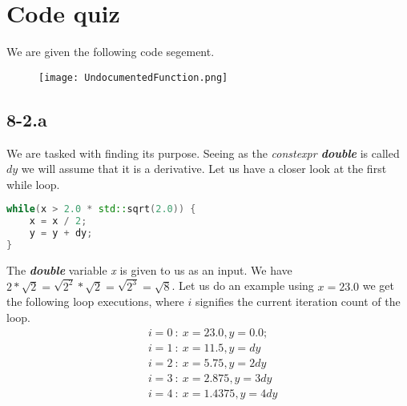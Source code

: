 \documentclass{article}
\begin{document}
\section*{Code quiz}
We are given the following code segement.
\begin{figure}[!hbt]
    \centering
\texttt{[image: UndocumentedFunction.png]}
\end{figure}
\subsection*{8-2.a} 
We are tasked with finding its purpose. Seeing as the \textit{constexpr \textbf{double}} is called $\textit{dy}$ we will assume that it is a derivative. Let us have a closer look at the first while loop.

\begin{lstlisting}[language=C++,
                   directivestyle={\color{black}}
                   emph={int,char,double,float,unsigned},
                   emphstyle={\color{blue}}
                  ]
while(x > 2.0 * std::sqrt(2.0)) {
    x = x / 2;
    y = y + dy;
}
\end{lstlisting}
The \textit{\textbf{double}} variable \textit{x} is given to us as an input. We have $2 * \sqrt{2} = \sqrt{2^{2}} * \sqrt{2} = \sqrt{2^{3}} = \sqrt{8}$. Let us do an example using $x = 23.0$ we get the following loop executions, where $i$ signifies the current iteration count of the loop.
\begin{align*}
    &i = 0\: : \: x = 23.0, y = 0.0; \\
    &i = 1 \: : \: x = 11.5, y = dy \\
    &i = 2 \: : \: x = 5.75, y = 2dy \\
    &i = 3 \: : \: x = 2.875, y = 3dy \\
    &i = 4 \: : \: x = 1.4375, y = 4dy
\end{align*}
\pagebreak
\end{document}
